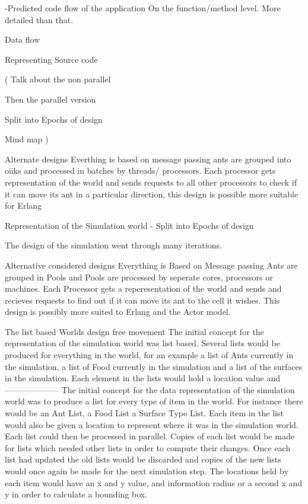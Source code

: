 \documentclass[main.tex]{subfiles}
\begin{document}
-Predicted code flow of the application
On the function/method level.
More detailed than that.

Data flow

Representing Source code

(
Talk about the non parallel

Then the parallel version

Split into Epochs of design

Mind map
)

Alternate designs
Everthing is based on message passing ants are grouped into oiiks and processed in batches by threads/ processors. Each processor gets representation of the world and sends requests to all other processors to check if it can move its ant in a particular direction, this design is possible more suitable for Erlang



Representation of the Simulation world - Split into Epochs of design

The design of the simulation went through many iterations.

Alternative considered designs
Everything is Based on Message passing Ants are grouped in Pools and Pools are processed by seperate cores, processors or machines. Each Processor gets a reperesentation of the world and sends and recieves requests to find  out if it can move its ant to the cell it wishes. This design is possibly more suited to Erlang and the Actor model.



The list based Worlds design free movement
The initial concept for the representation of the simulation world was list based. Several lists would be produced for everything in the world, for an example a list of Ants currently in the simulation, a list of Food currently in the simulation and a list of the surfaces in the simulation. Each element in the lists would hold a location value and --------------------
The  initial concept for the data representation of the simulation world was to produce a list for every type of item in the world. For instance there would be an Ant List, a Food List a Surface Type List. Each item in the list would also be given a location to represent where it was in the simulation world. Each list could then be processed in parallel. Copies of each list would be made for lists which needed other lists in order to compute their changes. Once each list had updated the old lists would be discarded and  copies of the new lists would once again be made for the next simulation step.‎ The locations held by each item would have an x and y value, and information radius or a second x and y in order to calculate a bounding box.
\end{document}
